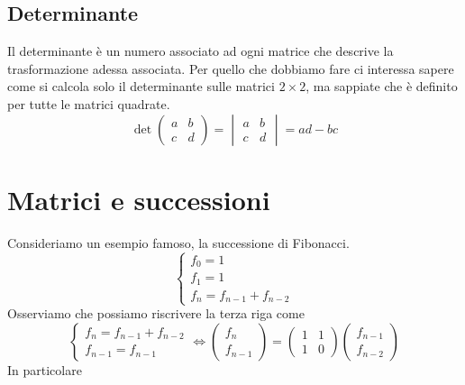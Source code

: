 \documentclass{article}     %
\begin{document}
\subsection{Determinante}
Il determinante è un numero associato ad ogni matrice che descrive la trasformazione adessa associata. Per quello che dobbiamo fare ci interessa sapere come si calcola solo il determinante sulle matrici $2\times 2$, ma sappiate che è definito per tutte le matrici quadrate. 
\[\det \begin{pmatrix} a&b\\c&d \end{pmatrix} = \begin{vmatrix} a&b\\c&d \end{vmatrix} = ad - bc\]
\section{Matrici e successioni}
Consideriamo un esempio famoso, la successione di Fibonacci. 
\[\begin{cases} f_0 = 1\\f_1 = 1\\f_n = f_{n - 1} + f_{n - 2} \end{cases} \]
Osserviamo che possiamo riscrivere la terza riga come 
\[\begin{cases} f_n = f_{n - 1} + f_{n - 2}\\ f_{n - 1} = f_{n - 1} \end{cases} \Longleftrightarrow \begin{pmatrix} f_n\\f_{n - 1} \end{pmatrix} = \begin{pmatrix} 1&1\\1&0 \end{pmatrix} \begin{pmatrix} f_{n - 1}\\f_{n - 2} \end{pmatrix} \]
In particolare
\end{document}
